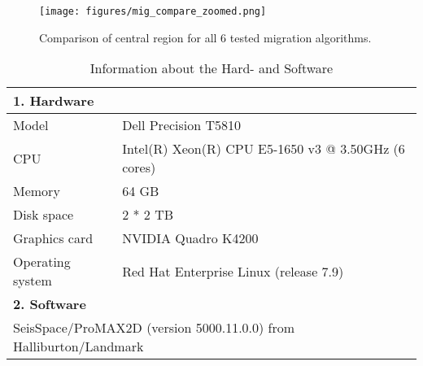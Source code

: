 
\begin{figure}[H]
\noindent\texttt{[image: figures/mig\_compare\_zoomed.png]}
\caption[Comparison of central region for migration algorithms]{Comparison of central region for all 6 tested migration algorithms.}
\label{figure:mig_comp_central}
\end{figure}

\begin{table}[!htb]
\caption{Information about the Hard- and Software}
\centering
\begin{tabular}{ll}
\hline 
\textbf{1. Hardware}  \\ \hline 
Model & Dell Precision T5810\\
CPU & Intel(R) Xeon(R) CPU E5-1650 v3 @ 3.50GHz (6 cores)\\
Memory & 64 GB\\
Disk space & 2 * 2 TB\\
Graphics card & NVIDIA Quadro K4200\\
Operating system & Red Hat Enterprise Linux (release 7.9)\\
 \hline \hline
\textbf{2. Software} \\ \hline 
\multicolumn{2}{l}{SeisSpace/ProMAX2D  (version 5000.11.0.0) from Halliburton/Landmark}\\  \hline
\end{tabular}
\label{table:hardwareinfo}
\end{table}

\cite{abc} %
\citep{abc} %
\citet{abc} %
